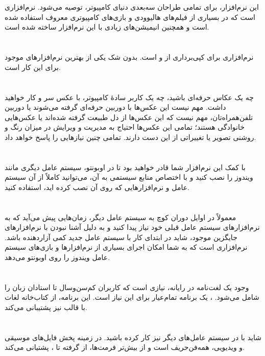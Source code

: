 \section[Blender]{}
این نرم‌افزار، برای تمامی طراحان سه‌بعدی دنیای کامپیوتر، توصیه می‌شود.  نرم‌افزاری است که در بسیاری از فیلم‌های هالیوودی و بازی‌های کامپیوتری معروف استفاده شده است و همچنین انیمیشن‌های زیادی با این نرم‌افزار ساخته شده است.

\section[K3b]{}
نرم‌افزاری برای کپی‌برداری از  و  است.  بدون شک یکی از بهترین نرم‌افزارهای موجود برای این کار است.

\section[Darktable]{}
چه یک عکاس حرفه‌ای باشید، چه یک کاربر سادهٔ کامپیوتر، با عکس سر و کار خواهید داشت. مهم نیست این عکس‌ها با دوربین حرفه‌ای گرفته می‌شوند یا دوربین تلفن‌همراه‌تان، مهم نیست که این عکس‌ها از دل طبیعت گرفته شده‌اند یا عکس‌هایی خانوادگی هستند؛ تمامی این عکس‌ها احتیاج به مدیریت و ویرایش در میزان رنگ و روشنی تصویر یا تغییراتی از این دست دارند.  تمامی چنین نیازهایی را پاسخ خواهد داد.

\section[Virtualbox]{}
با کمک این نرم‌افزار شما قادر خواهید بود تا در اوبونتو، سیستم عامل دیگری مانند ویندوز را نصب کنید و با اختصاص منابع سیستمی به آن، می‌توانید کاملاً از آن سیستم عامل و نرم‌افزارهایی که روی آن نصب کرده اید، استفاده کنید.

\section[Wine]{}
معمولاً در اوایل دوران کوچ به سیستم عامل دیگر، زمان‌هایی پیش می‌آید که به نرم‌افزارهای سیستم عامل قبلی خود نیاز پیدا کنید و به دلیل آشنا نبودن با نرم‌افزارهای جایگزین موجود، شاید در ابتدای کار با سیستم عامل جدید کمی آزار‌دهنده باشد.  نرم‌افزاری است که به شما امکان اجرای بسیاری از نرم‌افزارها و بازی‌های سیستم عامل ویندوز را روی اوبونتو می‌دهد.

\section[Goldendict]{}
وجود یک لغت‌نامه در رایانه، نیازی است که کاربران کم‌سن‌وسال تا استادان زبان را شامل می‌شود. ، یک برنامه تمام‌عیار برای این نیاز است. این برنامه، از کتاب‌خانه لغات  با قالب  نیز پشتیبانی می‌کند.

\section[VLC]{}
شاید با  در سیستم عامل‌های دیگر نیز کار کرده باشید.  در زمینه پخش فایل‌های موسیقی و ویدیویی، همه‌فن‌حریف است و از بیش‌تر فرمت‌ها، از  گرفته تا ، پشتیانی می‌کند.
